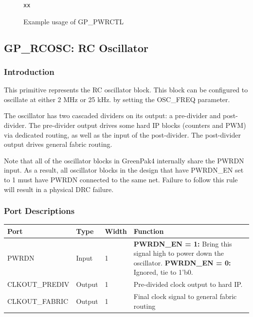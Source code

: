\documentclass{article}
\begin{document}
\begin{figure}[h]
\begin{lstlisting}
xx
\end{lstlisting}
\caption{Example usage of GP\_PWRCTL}
\label{gp-pwrctl-example}
\end{figure}


\pagebreak
\subsection{GP\_RCOSC: RC Oscillator}

\subsubsection{Introduction}
This primitive represents the RC oscillator block. This block can be configured to oscillate at either 2 MHz or 25 kHz. 
by setting the OSC\_FREQ parameter.

The oscillator has two cascaded dividers on its output: a pre-divider and post-divider. The pre-divider output drives 
some hard IP blocks (counters and PWM) via dedicated routing, as well as the input of the post-divider. The 
post-divider output drives general fabric routing.

Note that all of the oscillator blocks in GreenPak4 internally share the PWRDN input. As a result, all oscillator 
blocks in the design that have PWRDN\_EN set to 1 must have PWRDN connected to the same net. Failure to follow this 
rule will result in a physical DRC failure.

\subsubsection{Port Descriptions}

\begin{tabularx}{5in}{|l|l|l|X|}
\hline
{\bfseries Port} & {\bfseries Type} & {\bfseries Width} & {\bfseries Function} \\
\hline
PWRDN & Input & 1 &
	{\bfseries PWRDN\_EN = 1:} \newline Bring this signal high to power down the oscillator. \newline
	{\bfseries PWRDN\_EN = 0:} \newline Ignored, tie to 1'b0.\\
\hline
CLKOUT\_PREDIV & Output & 1 & Pre-divided clock output to hard IP.  \\
\hline
CLKOUT\_FABRIC & Output & 1 & Final clock signal to general fabric routing\\
\hline
\end{tabularx}
\end{document}

